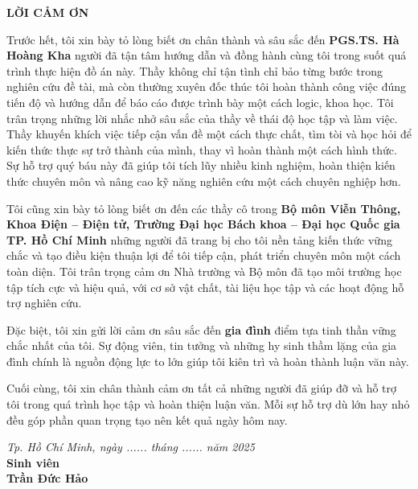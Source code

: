 \thispagestyle{empty}
\begin{center}
    \vspace*{1.5cm}
    \textbf{\fontsize{16}{19}\selectfont LỜI CẢM ƠN}
    \vspace{0.8cm}
\end{center}

\noindent
\setlength{\parindent}{1.5cm}
\setlength{\parskip}{6pt}
\fontsize{12}{14}\selectfont  

Trước hết, tôi xin bày tỏ lòng biết ơn chân thành và sâu sắc đến \textbf{PGS.TS. Hà Hoàng Kha} người đã tận tâm hướng dẫn và đồng hành cùng tôi trong suốt quá trình thực hiện đồ án này. Thầy không chỉ tận tình chỉ bảo từng bước trong nghiên cứu đề tài, mà còn thường xuyên đốc thúc tôi hoàn thành công việc đúng tiến độ và hướng dẫn để báo cáo được trình bày một cách logic, khoa học. Tôi trân trọng những lời nhắc nhở sâu sắc của thầy về thái độ học tập và làm việc. Thầy khuyến khích việc tiếp cận vấn đề một cách thực chất, tìm tòi và học hỏi để kiến thức thực sự trở thành của mình, thay vì hoàn thành một cách hình thức. Sự hỗ trợ quý báu này đã giúp tôi tích lũy nhiều kinh nghiệm, hoàn thiện kiến thức chuyên môn và nâng cao kỹ năng nghiên cứu một cách chuyên nghiệp hơn.

Tôi cũng xin bày tỏ lòng biết ơn đến các thầy cô trong \textbf{Bộ môn Viễn Thông, Khoa Điện – Điện tử, Trường Đại học Bách khoa – Đại học Quốc gia TP. Hồ Chí Minh} những người đã trang bị cho tôi nền tảng kiến thức vững chắc và tạo điều kiện thuận lợi để tôi tiếp cận, phát triển chuyên môn một cách toàn diện. Tôi trân trọng cảm ơn Nhà trường và Bộ môn đã tạo môi trường học tập tích cực và hiệu quả, với cơ sở vật chất, tài liệu học tập và các hoạt động hỗ trợ nghiên cứu.

Đặc biệt, tôi xin gửi lời cảm ơn sâu sắc đến \textbf{gia đình} điểm tựa tinh thần vững chắc nhất của tôi. Sự động viên, tin tưởng và những hy sinh thầm lặng của gia đình chính là nguồn động lực to lớn giúp tôi kiên trì và hoàn thành luận văn này.

Cuối cùng, tôi xin chân thành cảm ơn tất cả những người đã giúp đỡ và hỗ trợ tôi trong quá trình học tập và hoàn thiện luận văn. Mỗi sự hỗ trợ dù lớn hay nhỏ đều góp phần quan trọng tạo nên kết quả ngày hôm nay.

\vspace{0.8cm}
\begin{flushright}
    \begin{minipage}{0.5\textwidth}
        \centering
        \textit{Tp. Hồ Chí Minh, ngày ...... tháng ...... năm 2025} \\
        \vspace{0.8cm}
        \textbf{Sinh viên} \\
        \vspace{0.3cm}
        \textbf{Trần Đức Hảo}
    \end{minipage}
\end{flushright}

\vfill
\clearpage
